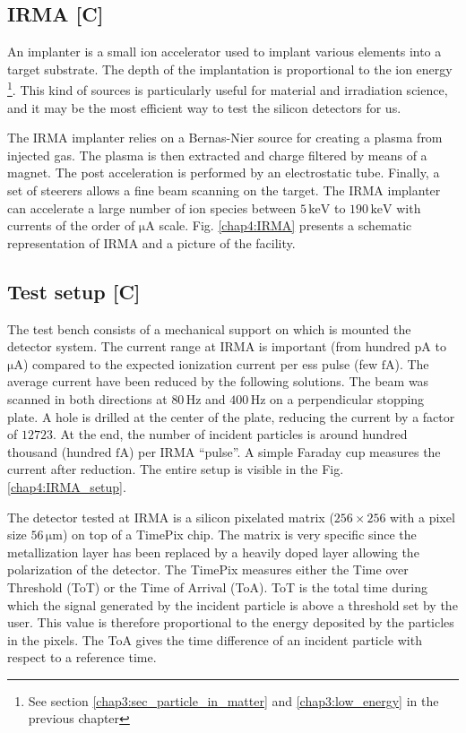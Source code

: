 \begin{refsection}
  \subsection{IRMA [C]}
  An implanter is a small ion accelerator used to implant various elements into a target substrate. The depth of the implantation is proportional to the ion energy \footnote{See section \ref{chap3:sec_particle_in_matter} and \ref{chap3:low_energy} in the previous chapter}. This kind of sources is particularly useful for material and irradiation science, and it may be the most efficient way to test the silicon detectors for us.

  The IRMA implanter \cite{Chaumont1981} relies on a Bernas-Nier source \cite{Paris1981} for creating a plasma from injected gas. The plasma is then extracted and charge filtered by means of a magnet. The post acceleration is performed by an electrostatic tube. Finally, a set of steerers allows a fine beam scanning on the target. The IRMA implanter can accelerate a large number of ion species between $5 \,\mathrm{keV}$ to $190 \,\mathrm{keV}$ with currents of the order of $\mathrm{\mu A}$ scale. Fig. \ref{chap4:IRMA} presents a schematic representation of IRMA and a picture of the facility.
  
  

  \subsection{Test setup [C]}

  The test bench consists of a mechanical support on which is mounted the detector system. The current range at IRMA is important (from hundred $\mathrm{pA}$ to $\mathrm{\mu A}$) compared to the expected ionization current per \acrshort{ess} pulse (few $\mathrm{fA}$). The average current have been reduced by the following solutions. The beam was scanned in both directions at $80 \,\mathrm{Hz}$ and $400\,\mathrm{Hz}$ on a perpendicular stopping plate. A hole is drilled at the center of the plate, reducing the current by a factor of $12723$. At the end, the number of incident particles is around hundred thousand (hundred $\mathrm{fA}$) per IRMA “pulse”. A simple Faraday cup measures the current after reduction. The entire setup is visible in the Fig. \ref{chap4:IRMA_setup}.

  

  The detector tested at IRMA is a silicon pixelated matrix ($256 \times 256$ with a pixel size $56\,\mathrm{\mu m}$) on top of a TimePix chip. The matrix is ​​very specific since the metallization layer has been replaced by a heavily doped layer allowing the polarization of the detector. The TimePix measures either the Time over Threshold (ToT) or the Time of Arrival (ToA). ToT is the total time during which the signal generated by the incident particle is above a threshold set by the user. This value is therefore proportional to the energy deposited by the particles in the pixels. The ToA gives the time difference of an incident particle with respect to a reference time.


\end{refsection}
